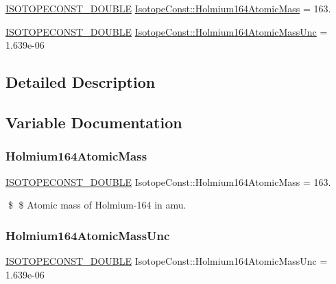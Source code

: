 \begin{DoxyCompactItemize}
\item 
\mbox{\hyperlink{group___isotope_const-_macros_ga8f45a7272ce02c0b4c65c44636ed719a}{I\+S\+O\+T\+O\+P\+E\+C\+O\+N\+S\+T\+\_\+\+D\+O\+U\+B\+LE}} \mbox{\hyperlink{group___isotope_const-_holmium-_ho164_gaee9303ce140b730ea6e1ea3b51ae8040}{Isotope\+Const\+::\+Holmium164\+Atomic\+Mass}} = 163.
\item 
\mbox{\hyperlink{group___isotope_const-_macros_ga8f45a7272ce02c0b4c65c44636ed719a}{I\+S\+O\+T\+O\+P\+E\+C\+O\+N\+S\+T\+\_\+\+D\+O\+U\+B\+LE}} \mbox{\hyperlink{group___isotope_const-_holmium-_ho164_ga8009a2333c4a46df577b5c9753cc980a}{Isotope\+Const\+::\+Holmium164\+Atomic\+Mass\+Unc}} = 1.\+639e-\/06
\end{DoxyCompactItemize}


\subsection{Detailed Description}


\subsection{Variable Documentation}
\mbox{\label{group___isotope_const-_holmium-_ho164_gaee9303ce140b730ea6e1ea3b51ae8040}} 
\subsubsection{\texorpdfstring{Holmium164\+Atomic\+Mass}{Holmium164AtomicMass}}
{\footnotesize\ttfamily \mbox{\hyperlink{group___isotope_const-_macros_ga8f45a7272ce02c0b4c65c44636ed719a}{I\+S\+O\+T\+O\+P\+E\+C\+O\+N\+S\+T\+\_\+\+D\+O\+U\+B\+LE}} Isotope\+Const\+::\+Holmium164\+Atomic\+Mass = 163.}

\$ \$ Atomic mass of Holmium-\/164 in amu. \mbox{\label{group___isotope_const-_holmium-_ho164_ga8009a2333c4a46df577b5c9753cc980a}} 
\subsubsection{\texorpdfstring{Holmium164\+Atomic\+Mass\+Unc}{Holmium164AtomicMassUnc}}
{\footnotesize\ttfamily \mbox{\hyperlink{group___isotope_const-_macros_ga8f45a7272ce02c0b4c65c44636ed719a}{I\+S\+O\+T\+O\+P\+E\+C\+O\+N\+S\+T\+\_\+\+D\+O\+U\+B\+LE}} Isotope\+Const\+::\+Holmium164\+Atomic\+Mass\+Unc = 1.\+639e-\/06}

